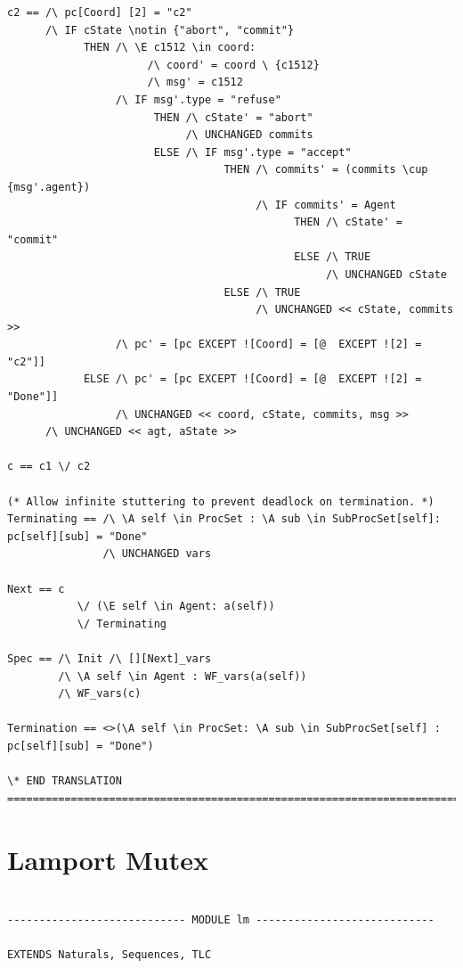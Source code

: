 \documentclass{thesul}
\begin{document}
\begin{appendices}
\begin{lstlisting}[caption = TLA+ translation for Sub-Processes, frame = tlrb, firstnumber = 1]
c2 == /\ pc[Coord] [2] = "c2"
      /\ IF cState \notin {"abort", "commit"}
            THEN /\ \E c1512 \in coord:
                      /\ coord' = coord \ {c1512}
                      /\ msg' = c1512
                 /\ IF msg'.type = "refuse"
                       THEN /\ cState' = "abort"
                            /\ UNCHANGED commits
                       ELSE /\ IF msg'.type = "accept"
                                  THEN /\ commits' = (commits \cup {msg'.agent})
                                       /\ IF commits' = Agent
                                             THEN /\ cState' = "commit"
                                             ELSE /\ TRUE
                                                  /\ UNCHANGED cState
                                  ELSE /\ TRUE
                                       /\ UNCHANGED << cState, commits >>
                 /\ pc' = [pc EXCEPT ![Coord] = [@  EXCEPT ![2] = "c2"]]
            ELSE /\ pc' = [pc EXCEPT ![Coord] = [@  EXCEPT ![2] = "Done"]]
                 /\ UNCHANGED << coord, cState, commits, msg >>
      /\ UNCHANGED << agt, aState >>

c == c1 \/ c2

(* Allow infinite stuttering to prevent deadlock on termination. *)
Terminating == /\ \A self \in ProcSet : \A sub \in SubProcSet[self]: pc[self][sub] = "Done"
               /\ UNCHANGED vars

Next == c
           \/ (\E self \in Agent: a(self))
           \/ Terminating

Spec == /\ Init /\ [][Next]_vars
        /\ \A self \in Agent : WF_vars(a(self))
        /\ WF_vars(c)

Termination == <>(\A self \in ProcSet: \A sub \in SubProcSet[self] : pc[self][sub] = "Done")

\* END TRANSLATION
=============================================================================

\end{lstlisting}

\section{Lamport Mutex}
\begin{lstlisting}[caption = TLA+ translation for Sub-Processes, frame = tlrb, firstnumber = 1]

---------------------------- MODULE lm ----------------------------

EXTENDS Naturals, Sequences, TLC


\end{lstlisting}
\end{appendices}
\end{document}
